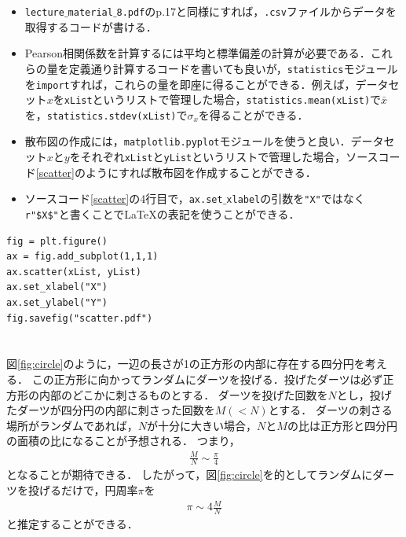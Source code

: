 \documentclass[a4paper,12pt]{jsarticle}
\begin{document}

\begin{itemize}
    \item \texttt{lecture$\_$material$\_$8.pdf}のp.17と同様にすれば，\texttt{.csv}ファイルからデータを取得するコードが書ける．
    \item Pearson相関係数を計算するには平均と標準偏差の計算が必要である．これらの量を定義通り計算するコードを書いても良いが，\texttt{statistics}モジュールを\texttt{import}すれば，これらの量を即座に得ることができる．例えば，データセット$x$を\texttt{xList}というリストで管理した場合，\texttt{statistics.mean(xList)}で$\bar{x}$を，\texttt{statistics.stdev(xList)}で$\sigma_{x}$を得ることができる．
    \item 散布図の作成には，\texttt{matplotlib.pyplot}モジュールを使うと良い．データセット$x$と$y$をそれぞれ\texttt{xList}と\texttt{yList}というリストで管理した場合，ソースコード\ref{scatter}のようにすれば散布図を作成することができる．
    \item ソースコード\ref{scatter}の4行目で，\texttt{ax.set$\_$xlabel}の引数を\texttt{"X"}ではなく\texttt{r"\$X\$"}と書くことで\LaTeX の表記を使うことができる．
\end{itemize}

\begin{lstlisting}[caption=散布図を描くためのPythonコード例,label=scatter]
fig = plt.figure()
ax = fig.add_subplot(1,1,1)
ax.scatter(xList, yList)
ax.set_xlabel("X")
ax.set_ylabel("Y")
fig.savefig("scatter.pdf")  
\end{lstlisting}

\section{}
\label{sec:problem_2}
図\ref{fig:circle}のように，一辺の長さが1の正方形の内部に存在する四分円を考える．
この正方形に向かってランダムにダーツを投げる．投げたダーツは必ず正方形の内部のどこかに刺さるものとする．
ダーツを投げた回数を$N$とし，投げたダーツが四分円の内部に刺さった回数を$M(<N)$とする．
ダーツの刺さる場所がランダムであれば，$N$が十分に大きい場合，$N$と$M$の比は正方形と四分円の面積の比になることが予想される．
つまり，
\begin{align*}
    \frac{M}{N}\sim\frac{\pi}{4}
\end{align*}
となることが期待できる．
したがって，図\ref{fig:circle}を的としてランダムにダーツを投げるだけで，円周率$\pi$を
\begin{align}
\label{eq:pi}
    \pi\sim4\frac{M}{N}
\end{align}
と推定することができる．
\end{document}
